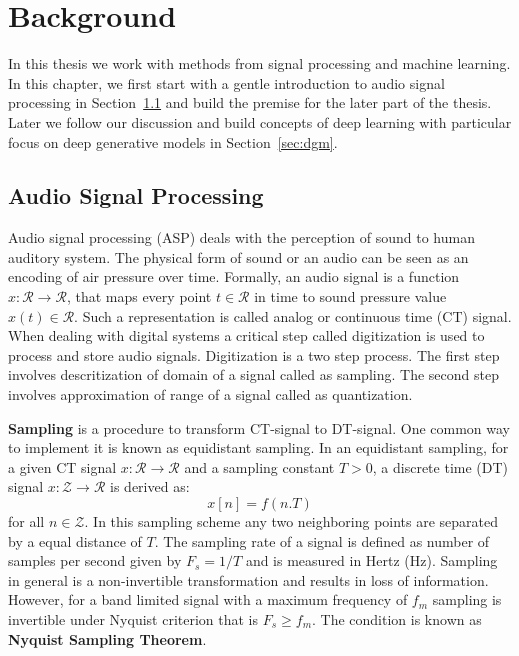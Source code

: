 \chapter{Background}
\label{ch:background}
In this thesis we work with methods from signal processing and machine learning. In this chapter, we first start with a gentle introduction to audio signal processing in Section~\ref{sec:asp} and build the premise for the later part of the thesis. Later we follow our discussion and build concepts of deep learning with particular focus on deep generative models in Section~\ref{sec:dgm}.

\section{Audio Signal Processing}
\label{sec:asp}
Audio signal processing (ASP) deals with the perception of sound to human auditory system. The physical form of sound or an audio can be seen as an encoding of air pressure over time. Formally, an audio signal is a function $x:\mathcal{R}\rightarrow \mathcal{R}$, that maps every point $t\in \mathcal{R}$ in time to sound pressure value $x(t)\in \mathcal{R}$. Such a representation is called analog or continuous time (CT) signal. When dealing with digital systems a critical step called digitization is used to process and store audio signals. Digitization is a two step process. The first step involves descritization of domain of a signal called as sampling. The second step involves approximation of range of a signal called as quantization. 

\textbf{Sampling} is a procedure to transform CT-signal to DT-signal. One common way to implement it is known as equidistant sampling. In an equidistant sampling, for a given CT signal $x:\mathcal{R}\rightarrow\mathcal{R}$ and a sampling constant $T>0$, a discrete time (DT) signal $x:\mathcal{Z}\rightarrow\mathcal{R}$ is derived as: 
\begin{equation}
\label{eq:sam}
x[n] = f(n.T)    
\end{equation}
for all $n\in \mathcal{Z}$. In this sampling scheme any two neighboring points are separated by a equal distance of $T$. The sampling rate of a signal is defined as number of samples per second given by $F_s=1/T$ and is measured in Hertz (Hz). Sampling in general is a non-invertible transformation and results in loss of information. However, for a band limited signal with a maximum frequency of $f_m$ sampling is invertible under Nyquist criterion that is $F_s\geq f_m$. The condition is known as \textbf{Nyquist Sampling Theorem}.


